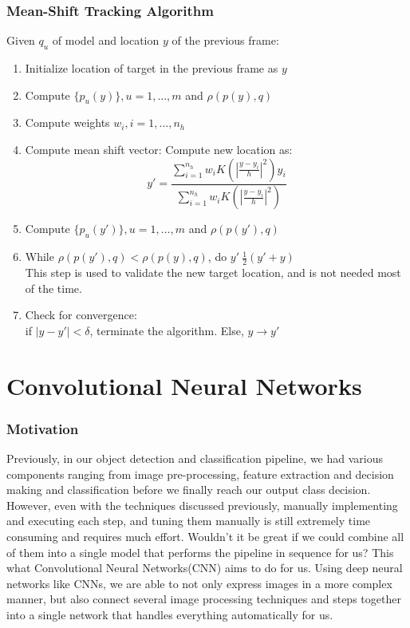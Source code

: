\documentclass[12pt]{article}
\begin{document}
\subsubsection{Mean-Shift Tracking Algorithm}
Given $q_u$ of model and location $y$ of the previous frame:
\begin{enumerate}
\item Initialize location of target in the previous frame as $y$
\item Compute $\{ p_u(y)\},  u = 1, ..., m$ and $\rho(p(y), q)$
\item Compute weights $w_i, i= 1,..., n_h$
\item Compute mean shift vector: Compute new location as:
\begin{equation*}
y' = \frac{\sum_{i=1}^{n_h} w_i K(|\frac{y - y_i}{h}|^2) y_i}{\sum_{i=1}^{n_h} w_i K(|\frac{y - y_i}{h}|^2)}
\end{equation*}
\item Compute $\{ p_u(y')\},  u = 1, ..., m$ and $\rho(p(y'), q)$
\item While $\rho(p(y'), q) < \rho(p(y), q)$, do $y' \ \frac{1}{2}(y' + y)$\\
This step is used to validate the new target location, and is not needed most of the time.
\item Check for convergence:\\
if $|y - y'| < \delta$, terminate the algorithm. Else, $y \rightarrow y'$
\end{enumerate}

\section{Convolutional Neural Networks}

\subsubsection{Motivation}

Previously, in our object detection and classification pipeline, we had various components ranging from image pre-processing, feature extraction and decision making and classification before we finally reach our output class decision. However, even with the techniques discussed previously, manually implementing and executing each step, and tuning them manually is still extremely time consuming and requires much effort. Wouldn't it be great if we could combine all of them into a single model that performs the pipeline in sequence for us? This what Convolutional Neural Networks(CNN) aims to do for us. Using deep neural networks like CNNs, we are able to not only express images in a more complex manner, but also connect several image processing techniques and steps together into a single network that handles everything automatically for us.\\
\end{document}
